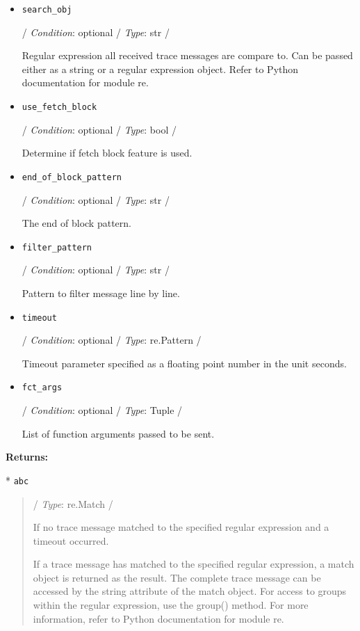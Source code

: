 \begin{itemize}
\item
  \texttt{search\_obj}

  / \emph{Condition}: optional / \emph{Type}: str /

  Regular expression all received trace messages are compare to. Can be
  passed either as a string or a regular expression object. Refer to
  Python documentation for module \textquotesingle re\textquotesingle.
\item
  \texttt{use\_fetch\_block}

  / \emph{Condition}: optional / \emph{Type}: bool /

  Determine if \textquotesingle fetch block\textquotesingle{} feature is
  used.
\item
  \texttt{end\_of\_block\_pattern}

  / \emph{Condition}: optional / \emph{Type}: str /

  The end of block pattern.
\item
  \texttt{filter\_pattern}

  / \emph{Condition}: optional / \emph{Type}: str /

  Pattern to filter message line by line.
\item
  \texttt{timeout}

  / \emph{Condition}: optional / \emph{Type}: re.Pattern /

  Timeout parameter specified as a floating point number in the unit
  \textquotesingle seconds\textquotesingle.
\item
  \texttt{fct\_args}

  / \emph{Condition}: optional / \emph{Type}: Tuple /

  List of function arguments passed to be sent.
\end{itemize}

\textbf{Returns:}

* \texttt{abc}

\begin{quote}
/ \emph{Type}: re.Match /

If no trace message matched to the specified regular expression and a
timeout occurred.

If a trace message has matched to the specified regular expression, a
match object is returned as the result. The complete trace message can
be accessed by the \textquotesingle string\textquotesingle{} attribute
of the match object. For access to groups within the regular expression,
use the group() method. For more information, refer to Python
documentation for module \textquotesingle re\textquotesingle.
\end{quote}

